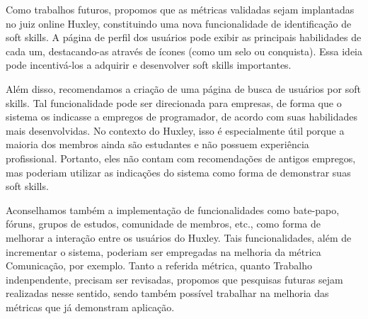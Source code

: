 Como trabalhos futuros, propomos que as métricas validadas sejam implantadas no juiz online Huxley, constituindo uma nova funcionalidade de identificação de soft skills. A página de perfil dos usuários pode exibir as principais habilidades de cada um, destacando-as através de ícones (como um selo ou conquista). Essa ideia pode incentivá-los a adquirir e desenvolver soft skills importantes.

Além disso, recomendamos a criação de uma página de busca de usuários por soft skills. Tal funcionalidade pode ser direcionada para empresas, de forma que o sistema os indicasse a empregos de programador, de acordo com suas habilidades mais desenvolvidas. No contexto do Huxley, isso é especialmente útil porque a maioria dos membros ainda são estudantes e não possuem experiência profissional. Portanto, eles não contam com recomendações de antigos empregos, mas poderiam utilizar as indicações do sistema como forma de demonstrar suas soft skills.

Aconselhamos também a implementação de funcionalidades como bate-papo, fóruns, grupos de estudos, comunidade de membros, etc., como forma de melhorar a interação entre os usuários do Huxley. Tais funcionalidades, além de incrementar o sistema, poderiam ser empregadas na melhoria da métrica Comunicação, por exemplo. Tanto a referida métrica, quanto Trabalho indenpendente, precisam ser revisadas, propomos que pesquisas futuras sejam realizadas nesse sentido, sendo também possível trabalhar na melhoria das métricas que já demonstram aplicação.




